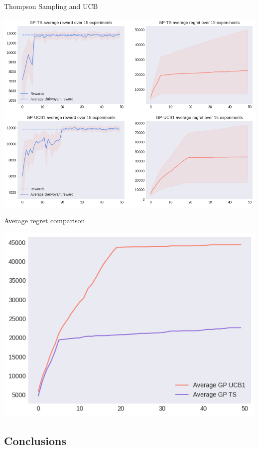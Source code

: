 Thompson Sampling and UCB

\begin{center}
	\includegraphics[scale=0.5]{img/Graphs/uncertain_alpha/image4.png}
	\includegraphics[scale=0.5]{img/Graphs/uncertain_alpha/image5.png}
\end{center}

Average regret comparison

\begin{center}
	\includegraphics[scale=0.5]{img/Graphs/uncertain_alpha/image6.png}
\end{center}

\subsection{Conclusions}

